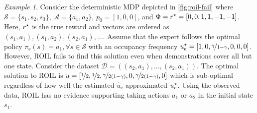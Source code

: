 \documentclass[10pt]{article}
\theoremstyle{plain}
\theoremstyle{remark}
\newtheorem{example}{Example}
\begin{document}
\begin{example} \label{exm:roil-limitations}
Consider the deterministic MDP depicted in \cref{fig:roil-fail} where $\mathcal{S} = \{s_1, s_2, s_3\}$, $\mathcal{A} = \{a_1, a_2\}$, $p_0 = [1,0,0]$, and $\Phi = r^{\mathnormal{\star}} = [0,0,1,1,-1,-1]$. Here, $r^{\mathnormal{\star}}$ is the true reward and vectors are ordered as $(s_1,a_1), (s_1, a_2), (s_2,a_1), \dots $. Assume that the expert follows the optimal policy $\pi_{\mathrm{e}}(s) = a_1, \forall s\in \mathcal{S}$ with an occupancy frequency $u_{\mathrm{e}}^{\mathnormal{\star}}  = [1,0,\nicefrac{\gamma}{1-\gamma},0,0,0]$. However, ROIL fails to find this solution even when demonstrations cover all but one state. Consider the dataset $\mathcal{D} = ((s_2, a_1),  \dots, (s_2, a_1))$. The optimal solution to ROIL is $u = [\nicefrac{1}{2},\nicefrac{1}{2},\nicefrac{\gamma}{2(1-\gamma)},0,\nicefrac{\gamma}{2(1-\gamma)},0]$ which is sub-optimal regardless of how well the estimated $\hat{u}_{\mathrm{e}}$ approximated $u_{\mathrm{e}}^{\mathnormal{\star}} $. Using the observed data, ROIL has no evidence supporting taking actions $a_1$ or $a_2 $ in the initial state $s_1$.
\end{example} 
\end{document}
